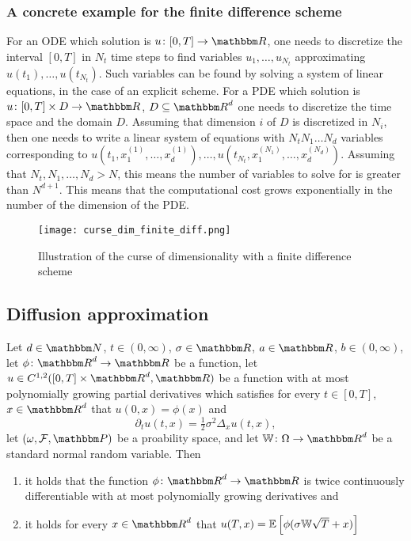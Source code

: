 \subsubsection*{A concrete example for the finite difference scheme}
For an ODE which solution is $u \colon [0,T] \to \R$, one needs to discretize the interval $[0,T]$ in $N_t$ time steps to find variables $u_1, \dots, u_{N_t}$ approximating $u(t_1), \dots, u(t_{N_t})$. Such variables can be found by solving a system of linear equations, in the case of an explicit scheme. For a PDE which solution is $u \colon [0,T] \times D \to \R$, $D\subseteq \R^d$ one needs to discretize the time space and the domain $D$. Assuming that dimension $i$ of $D$ is discretized in $N_i$, then one needs to write a linear system of equations with $N_t N_1 \dots N_d$ variables corresponding to $u(t_1, x_1^{(1)}, \dots, x_d^{(1)}), \dots, u(t_{N_t}, x_1^{(N_1)}, \dots, x_d^{(N_d)})$. Assuming that $N_t, N_1, \dots, N_d > N$, this means the number of variables to solve for is  greater than $N^{d+1}$. This means that the computational cost grows exponentially in the number of the dimension of the PDE.

\begin{figure}
    \center
    \texttt{[image: curse\_dim\_finite\_diff.png]}
    \caption{Illustration of the curse of dimensionality with a finite difference scheme}
\end{figure}

\subsection*{Diffusion approximation}
\begin{proposition}
    Let $d \in \N$, 
    $t \in (0, \infty)$, 
    $\sigma \in \R$,
    $a \in \R$,
    $b \in (0, \infty)$, 
    let 
    $\phi \colon \R^d \to \R$ 
    be a function,
    let 
    $u \in C^{1,2}([0,T] \times \R^d, \R)$ 
    be a function with at most polynomially growing partial derivatives which satisfies for every 
    $t\in [0,T]$,
    $x \in \R^d$ 
    that
    $u(0, x) = \phi(x)$ 
    and
    \begin{equation}
        \partial_t u(t, x) = \tfrac{1}{2} \sigma^2 \Delta_x u(t,x),
    \end{equation}
    let $(\omega, \F, \P)$ be a proability space, and let $\W \colon \Omega\to\R^d$ be a standard normal random variable.
    Then
    \begin{enumerate}[label=(\roman*)]
        \item it holds that the function $\phi \colon \R^d \to \R$ is twice continuously differentiable with at most polynomially growing derivatives and 
        \item it holds for every $x \in \R^d$ that $u(T, x) = {\mathbb{E}}\left[ \phi(\sigma {\ensuremath{\mathbb{W}}} \sqrt{T} + x)\right]$
    \end{enumerate} 
\end{proposition}

